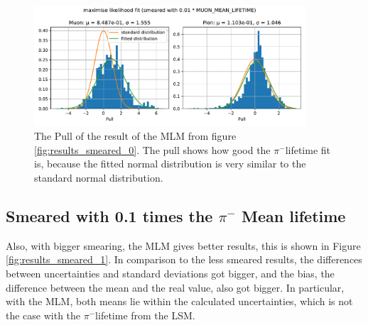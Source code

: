 \documentclass[11pt, a4paper, oneside]{book}
\newcommand\DoublePlotwidth{0.9}
\newcommand{\pion}{$\pi^{-}$}
\begin{document}
\begin{figure}[h]
    \centering
    \includegraphics[width=\DoublePlotwidth\textwidth]{images/4b_pull_0_likelihood.pdf}
    \caption{The Pull of the result of the MLM from figure \ref{fig:results_smeared_0}. The pull shows how good the \pion lifetime fit is, because the fitted normal distribution is very similar to the standard normal distribution.}
    \label{fig:smeared_pull_0}
\end{figure}

\FloatBarrier
\newpage
\subsection{Smeared with 0.1 times the \texorpdfstring{\pion}{pion} Mean lifetime}

Also, with bigger smearing, the MLM gives better results, this is shown in Figure \ref{fig:results_smeared_1}. In comparison to the less smeared results, the differences between uncertainties and standard deviations got bigger, and the bias, the difference between the mean and the real value, also got bigger. In particular, with the MLM, both means lie within the calculated uncertainties, which is not the case with the \pion lifetime from the LSM.
\end{document}
